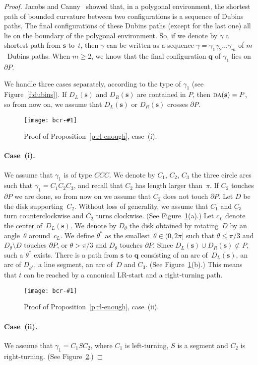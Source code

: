 \documentclass[a4paper]{article}
\newcommand{\vecs}{{\mathbf{s}}}
\newcommand{\vecq}{{\mathbf{q}}}
\newcommand{\ldisk}{{D_L}}
\newcommand{\rdisk}{{D_R}}
\newcommand{\bd}{\partial}
\newcommand{\thetastar}{\theta^{\ast}}
\DeclareMathOperator{\DA}{\textsc{da}}
\let\leq\leqslant
\let\geq\geqslant
\newcommand{\epsfigure}[2]{
  \begin{figure}[htb]
    \centerline{\texttt{[image: bcr-\#1]}}
    \caption{#2}
    \label{f:#1}
  \end{figure}}
\begin{document}
\begin{proof}
  Jacobs and Canny~\cite{jc-pspmr-92} showed that, in a polygonal
  environment, the shortest path of bounded curvature between two
  configurations is a sequence of Dubins paths.  The final
  configurations of these Dubins paths (except for the last one) all
  lie on the boundary of the polygonal environment. So, if we denote
  by $\gamma$ a shortest path from $\vecs$ to~$t$, then $\gamma$ can
  be written as a sequence $\gamma=\gamma_1 \gamma_2 \dots \gamma_m$
  of $m$~Dubins paths. When $m \geq 2$, we know that the final
  configuration $\vecq$ of $\gamma_1$ lies on $\bd P$.

  We handle three cases separately, according to the type of
  $\gamma_1$ (see Figure~\ref{f:dubins}). If $\ldisk(\vecs)$ and
  $\rdisk(\vecs)$ are contained in $P$, then $\DA(\vecs)=P$, so from
  now on, we assume that $\ldisk(\vecs)$ or $\rdisk(\vecs)$ crosses
  $\bd P$.

\epsfigure{casei}{Proof of Proposition~\ref{p:rl-enough},
  case~(i).}
\paragraph{Case~(i).} We assume that $\gamma_1$ is of type $CCC$.
  We denote by $C_1$, $C_2$, $C_3$ the three circle arcs such that
  $\gamma_1=C_1C_2C_3$, and recall that $C_2$ has length larger
  than~$\pi$.  If $C_2$ touches $\bd{P}$ we are done, so from now on
  we assume that $C_2$ does not touch $\bd{P}$.  Let $D$ be the disk
  supporting~$C_2$.  Without loss of generality, we assume that $C_1$
  and $C_3$ turn counterclockwise and $C_2$ turns clockwise.  (See
  Figure~\ref{f:casei}(a).)  Let $c_L$ denote the center
  of~$\ldisk(\vecs)$.  We denote by $D_\theta$ the disk obtained by
  rotating~$D$ by an angle~$\theta$ around~$c_L$. We define
  $\thetastar$ as the smallest~$\theta \in (0,2\pi]$ such that $\theta
    \leq \pi/3$ and $D_\theta \setminus D$ touches $\bd{P}$, or
    $\theta > \pi/3$ and $D_\theta$ touches $\bd{P}$.  Since
    $\ldisk(\vecs) \cup \rdisk(\vecs)\not\subset P$, such a
    $\thetastar$ exists.  There is a path from $\vecs$ to $\vecq$
    consisting of an arc of~$\ldisk(\vecs)$, an arc of $D_{\theta^*}$,
    a line segment, an arc of~$D$ and $C_3$. (See
    Figure~\ref{f:casei}(b).)  This means that $t$ can be reached by a
    canonical LR-start and a right-turning path.

\epsfigure{caseii}{Proof of Proposition~\ref{p:rl-enough},
  case~(ii).}
\paragraph{Case~(ii).} We assume that $\gamma_1=C_1SC_2$,
  where $C_1$ is left-turning, $S$ is a segment and 
  $C_2$ is right-turning. (See Figure~\ref{f:caseii}.)


\end{proof}
\end{document}
